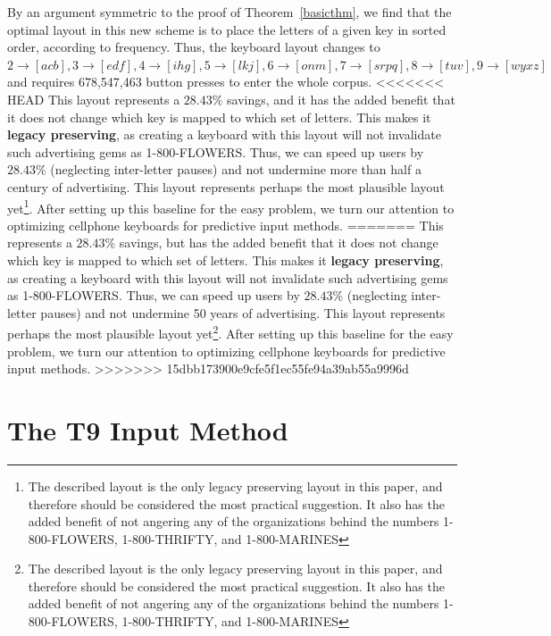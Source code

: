 \documentclass[runningheads]{llncs}
\newcommand{\newword}[1]{{\bf #1}}
\begin{document}
\begin{prob}[{\sc
MinimumKeystrokes}]
By an argument symmetric to the proof of Theorem~\ref{basicthm}, we find that
the optimal layout in this new scheme is to place the letters of a given key in
sorted order, according to frequency.  Thus, the keyboard layout changes to
$2\to[acb], 3\to[edf], 4\to[ihg], 5\to[lkj], 6\to[onm], 7\to[srpq], 8\to[tuv],
9\to[wyxz]$ and requires 678,547,463 button presses to enter the whole corpus.
<<<<<<< HEAD
This layout represents a $28.43\%$ savings, and it has the added benefit that
it does not change which key is mapped to which set of letters.  This makes it
\newword{legacy preserving}, as creating a keyboard with this layout will not
invalidate such advertising gems as 1-800-FLOWERS.  Thus, we can speed up users
by $28.43\%$ (neglecting inter-letter pauses) and not undermine more than half
a century of advertising.  This layout represents perhaps the most plausible
layout yet\footnote{The described layout is the only legacy preserving layout
in this paper, and therefore should be considered the most practical
suggestion.  It also has the added benefit of not angering any of the
organizations behind the numbers 1-800-FLOWERS, 1-800-THRIFTY, and
1-800-MARINES}.  After setting up this baseline for the easy problem, we turn
our attention to optimizing cellphone keyboards for predictive input methods.
=======
This represents a $28.43\%$ savings, but has the added benefit that it does not
change which key is mapped to which set of letters.  This makes it
\newword{legacy preserving}, as creating a keyboard with this layout will not
invalidate such advertising gems as 1-800-FLOWERS.  Thus, we can speed up users
by $28.43\%$ (neglecting inter-letter pauses) and not undermine 50 years of
advertising.  This layout represents perhaps the most plausible layout
yet\footnote{The described layout is the only legacy preserving layout in this
paper, and therefore should be considered the most practical suggestion.  It
also has the added benefit of not angering any of the organizations behind the
numbers 1-800-FLOWERS, 1-800-THRIFTY, and 1-800-MARINES}.  After setting up
this baseline for the easy problem, we turn our attention to optimizing
cellphone keyboards for predictive input methods.
>>>>>>> 15dbb173900e9cfe5f1ec55fe94a39ab55a9996d

\section{The T9 Input Method}


\end{prob}
\end{document}
